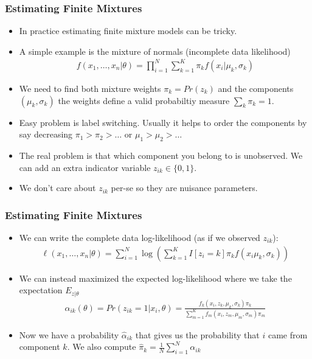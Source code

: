 \documentclass[aspectratio=169]{beamer}
\begin{document}
\begin{frame}
\frametitle{Estimating Finite Mixtures}
\begin{itemize}
\item In practice estimating finite mixture models can be tricky.
\item A simple example is the mixture of normals (incomplete data likelihood)
\begin{eqnarray*}
f(x_1,\ldots,x_n | \theta) = \prod_{i=1}^N \sum_{k=1}^K \pi_k f(x_i | \mu_k, \sigma_k)
\end{eqnarray*}
\item We need to find both mixture weights $\pi_k = Pr(z_k)$ and the components $(\mu_k,\sigma_k)$ the weights define a valid probabiltiy measure $\sum_k \pi_k = 1$.
\item Easy problem is \alert{label switching}. Usually it helps to order the components by say decreasing $\pi_1 > \pi_2 > \ldots$ or  $\mu_1 > \mu_2 > \ldots$ 
\item The real problem is that which component you belong to is unobserved. We can add an extra indicator variable $z_{ik} \in \{0,1\}$.
\item We don't care about $z_{ik}$ per-se so they are \alert{nuisance parameters}.
\end{itemize}
\end{frame}

\begin{frame}
\frametitle{Estimating Finite Mixtures}
\begin{itemize}
\item We can write the complete data log-likelihood (as if we observed $z_{ik}$):
\begin{eqnarray*}
\ell(x_1,\ldots,x_n | \theta) = \sum_{i=1}^N  \log \left( \sum_{k=1}^K I[z_i = k]  \pi_k f(x_i \mu_k, \sigma_k) \right)
\end{eqnarray*}
\item We can instead maximized the expected log-likelihood where we take the expectation $E_{z|\theta}$
\begin{eqnarray*}
\alpha_{ik}(\theta) = Pr(z_{ik} =1 | x_i,\theta) = \frac{f_k(x_i,z_k,\mu_k,\sigma_k) \pi_k }{\sum_{m=1}^K f_m(x_i,z_m,\mu_m,\sigma_m) \pi_m}
\end{eqnarray*}
\item Now we have a probability $\hat{\alpha}_{ik}$ that gives us the probability that $i$ came from component $k$. We also compute $\hat{\pi}_k = \frac{1}{N} \sum_{i=1}^N \alpha_{ik}$
\end{itemize}
\end{frame}
\end{document}
